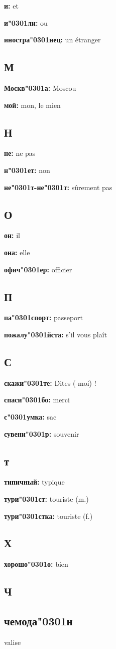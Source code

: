 \documentclass[a5paper, 10pt]{article}
\newcommand{\лекси}[2]{{\textbf{#1: }{#2}\par}}
\newcommand{\ак}[0]{\char"0301} %
\begin{document}
\begin{multicols}{2}
  \лекси{и}{et}
  \лекси{и\ак ли}{ou}
  \лекси{иностра\ак нец}{un étranger}
  
  \subsection*{М}
  
  \лекси{Москв\ак а}{Moscou}
  \лекси{мой}{mon, le mien}

  \subsection*{Н}
  \лекси{не}{ne pas}
  \лекси{н\ак ет}{non}

  \лекси{не\ак т-не\ак т}{sûrement pas}
  
  \subsection*{О}

  \лекси{он}{il}
  \лекси{она}{elle}
  \лекси{офич\ак ер}{officier}

  \subsection*{П}
  
  \лекси{па\ак спорт}{passeport}
  \лекси{пожалу\ак йста}{s'il vous plaît}
  \subsection*{С}
  \лекси{скажи\ак те}{Dites (-moi) !}
  \лекси{спаси\ак бо}{merci}
  \лекси{с\ак умка}{sac}
  \лекси{сувени\ак р}{souvenir}
  \subsection*{т}

  \лекси{типичный}{typique}
  \лекси{тури\ак ст}{touriste (m.)}
  \лекси{тури\ак стка}{touriste (f.)}

  \subsection*{Х}
  \лекси{хорошо\ак о}{bien}
  
  \subsection*{Ч}
  \subsection*{чемода\ак н}{valise}

\end{multicols}
\end{document}
